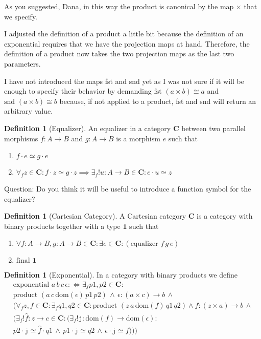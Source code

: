 \documentclass[a4paper, 11pt]{article}
\theoremstyle{definition}
\newtheorem{definition}[theorem]{Definition}
\newcommand{\cat}{%
	\mathbf %
}
\newcommand{\domain}[ 1 ]{%
	\mathrm{dom}(#1)%
}
\newcommand{\notion}[1]{\text{#1 }}
\newcommand{\product}[5]{\notion{product} (#1 \, #2 \, #3 \, #4 \, #5)}
\begin{document}
As you suggested, Dana, in this way the product is canonical by the map $\times$ that we specify.

I adjusted the definition of a product a little bit because the definition of an exponential requires that we have the projection maps at hand. Therefore, the definition of a product now takes the two projection maps as the last two parameters.

I have not introduced the maps fst and snd yet as I was not sure if it will be enough to specify their behavior by demanding $ \text{fst } (a \times b) \cong a$ and $\text{snd } (a \times b) \cong b$ because, if not applied to a product, fst and snd will return an arbitrary value.  

\begin{definition}[Equalizer]
	An equalizer in a category $\cat C$ between two parallel morphisms $f:A \to B$ and $g: A \to B$ is a morphism $e$ such that
	\begin{enumerate}
		\item $f \cdot e \simeq g \cdot e$
		\item $\forall_f z \in \cat C: f \cdot z \simeq g \cdot z \implies \exists_f!u:A\to B\in \cat C: e \cdot u \simeq z$ 
	\end{enumerate}
	
\end{definition}

Question: Do you think it will be useful to introduce a function symbol for the equalizer?

\begin{definition}[Cartesian Category]
	A Cartesian category $\cat C$ is a category with binary products together with a type $\boldsymbol{1}$ such that
	\begin{enumerate}
		\item $\forall f:A\to B,g:A\to B \in \cat C: \exists e\in \cat C: (\text{equalizer } f \, g \, e)$
		\item $\text{final } \boldsymbol{1}$
	\end{enumerate}
\end{definition}

\begin{definition}[Exponential]
	In a category with binary products we define
	\begin{multline*}
		\notion {exponential} a \, b \, c \, \epsilon :\iff 
		\exists_f p1, p2 \in \cat C: \\ \product{a}{c}{\domain \epsilon}{ p1}{p2} \, \wedge \, \epsilon:(a\times c)\to b  \, \wedge \\
		(\forall_f z, f \in \cat C : \exists_f q1,q2 \in \cat C: \product{z}{a}{\domain f}{q1}{q2} \wedge f:(z\times a)\to b \, \wedge \\
		(\exists_f!\hat{f}:z\to c \in \cat C : (\exists_f!\mathtt{j}:\domain{f} \to \domain{\epsilon}: \\ p2 \cdot \mathtt{j} \simeq \hat{f} \cdot q1 \, \wedge \, p1 \cdot \mathtt{j} \simeq q2 \, \wedge \, \epsilon \cdot \mathtt{j} \simeq f)))
	\end{multline*}
\end{definition}
\end{document}
